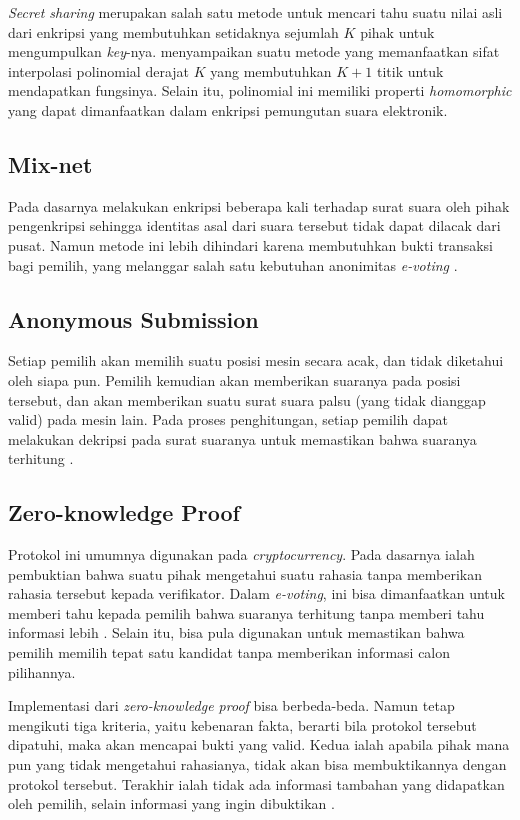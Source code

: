\textit{Secret sharing} merupakan salah satu metode untuk mencari tahu suatu nilai asli dari enkripsi yang membutuhkan setidaknya sejumlah $K$ pihak untuk mengumpulkan \textit{key}-nya. \cite{secretsharing3} menyampaikan suatu metode yang memanfaatkan sifat interpolasi polinomial derajat $K$ yang membutuhkan $K+1$ titik untuk mendapatkan fungsinya. Selain itu, polinomial ini memiliki properti \textit{homomorphic} yang dapat dimanfaatkan dalam enkripsi pemungutan suara elektronik.

\subsection{Mix-net}

Pada dasarnya melakukan enkripsi beberapa kali terhadap surat suara oleh pihak pengenkripsi sehingga identitas asal dari suara tersebut tidak dapat dilacak dari pusat. Namun metode ini lebih dihindari karena membutuhkan bukti transaksi bagi pemilih, yang melanggar salah satu kebutuhan anonimitas \textit{e-voting} \citep{mixnet}.

\subsection{Anonymous Submission}

Setiap pemilih akan memilih suatu posisi mesin secara acak, dan tidak diketahui oleh siapa pun. Pemilih kemudian akan memberikan suaranya pada posisi tersebut, dan akan memberikan suatu surat suara palsu (yang tidak dianggap valid) pada mesin lain. Pada proses penghitungan, setiap pemilih dapat melakukan dekripsi pada surat suaranya untuk memastikan bahwa suaranya terhitung \citep{anonsus}.

\subsection{Zero-knowledge Proof}

Protokol ini umumnya digunakan pada \textit{cryptocurrency}. Pada dasarnya ialah pembuktian bahwa suatu pihak mengetahui suatu rahasia tanpa memberikan rahasia tersebut kepada verifikator. Dalam \textit{e-voting}, ini bisa dimanfaatkan untuk memberi tahu kepada pemilih bahwa suaranya terhitung tanpa memberi tahu informasi lebih \cite{zeroknow}. Selain itu, bisa pula digunakan untuk memastikan bahwa pemilih memilih tepat satu kandidat tanpa memberikan informasi calon pilihannya.

Implementasi dari \textit{zero-knowledge proof} bisa berbeda-beda. Namun tetap mengikuti tiga kriteria, yaitu kebenaran fakta, berarti bila protokol tersebut dipatuhi, maka akan mencapai bukti yang valid. Kedua ialah apabila pihak mana pun yang tidak mengetahui rahasianya, tidak akan bisa membuktikannya dengan protokol tersebut. Terakhir ialah tidak ada informasi tambahan yang didapatkan oleh pemilih, selain informasi yang ingin dibuktikan \citep{zeroknow2}. 

